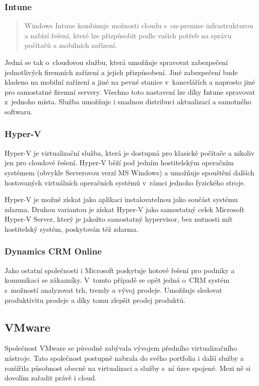 \subsubsection{Intune}
\begin{quote}
Windows Intune kombinuje možnosti cloudu s~on-premise infrastrukturou a nabízí řešení, které lze přizpůsobit podle vašich potřeb na správu počítačů a mobilních zařízení.\cite{ms:intune}
\end{quote}

Jedná se tak o~cloudovou službu, která umožňuje spravovat zabezpečení jednotlivých firemních zařízení a jejich přizpůsobení. Jiné zabezpečení bude kladeno na mobilní zařízení a jiné na pevné stanice v~kancelářích a naprosto jiné pro samostatné firemní servery. Všechno toto nastavení lze díky Intune spravovat z~jednoho místa. Služba umožňuje i snadnou distribuci aktualizací a samotného softwaru.

\subsubsection{Hyper-V}
Hyper-V je virtualizační služba, která je dostupná pro klasické počítače a nikoliv jen pro cloudové řešení. Hyper-V běží pod jedním hostitelským operačním systémem (obvykle Serverovou verzí MS Windows) a umožňuje spouštění dalších hostovaných virtuálních operačních systémů v~rámci jednoho fyzického stroje.

Hyper-V je možné získat jako aplikaci instalovatelnou jako součást systému zdarma. Druhou variantou je získat Hyper-V jako samostatný celek Microsoft Hyper-V Server, který je jakožto samostatný hypervisor, bez nutnosti mít hostitelský systém, poskytován též zdarma.

\subsubsection{Dynamics CRM Online}
Jako ostatní společnosti i Microsoft poskytuje hotové řešení pro podniky a komunikaci se zákazníky. V~tomto případě se opět jedná o~CRM systém s~možností analyzovat trh, trendy a vývoj prodeje. Umožňuje sledovat produktivitu prodeje a díky tomu zlepšit prodej produktů.

\subsection{VMware}
Společnost VMware se původně zabývala vývojem předního virtualizačního nástroje. Tato společnost postupně nabrala do svého portfolia i další služby a rozšířila působnost obecně na virtualizaci a služby s~ní úzce spojené. Mezi ně si dovolím zařadit právě i cloud.

